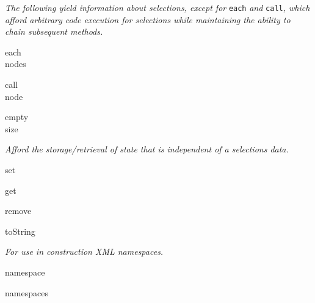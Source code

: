 
\textit{The following yield information about selections, except for }\texttt{each}\textit{ and }\texttt{call}\textit{, which afford arbitrary code execution for selections while maintaining the ability to chain subsequent methods.}


{\footnotesize 
\begin{minipage}[t]{2.0cm}
    each\\
    nodes
\end{minipage}
\begin{minipage}[t]{2.0cm}
    call\\
    node
\end{minipage}
\begin{minipage}[t]{2.0cm}
    empty\\
    size
\end{minipage}
}



\textit{Afford the storage/retrieval of state that is independent of a selection\textquotesingle s data.}

{\footnotesize 
\begin{minipage}[t]{1.5cm}
    set
\end{minipage}
\begin{minipage}[t]{1.5cm}
    get
\end{minipage}
\begin{minipage}[t]{1.5cm}
    remove
\end{minipage}
\begin{minipage}[t]{1.5cm}
    toString
\end{minipage}
}



\textit{For use in construction XML namespaces.}

{\footnotesize 
\begin{minipage}[t]{2.0cm}
    namespace
\end{minipage}
\begin{minipage}[t]{2.0cm}
    namespaces
\end{minipage}
}
